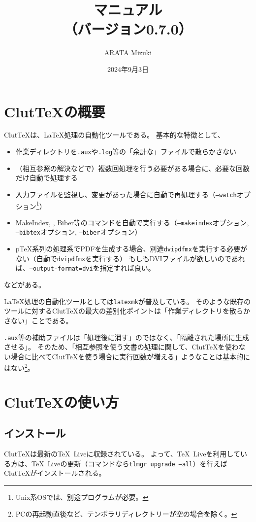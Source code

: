 \documentclass[a4paper]{ltjsreport}
\title{\ClutTeX{}マニュアル\\（バージョン0.7.0）}%
\author{ARATA Mizuki}
\date{2024年9月3日}
\newcommand\ClutTeX{Clut\TeX}
\begin{document}
\maketitle
\tableofcontents

\chapter{\ClutTeX{}の概要}
\ClutTeX{}は、\LaTeX{}処理の自動化ツールである。
基本的な特徴として、
\begin{itemize}
\item 作業ディレクトリを\texttt{.aux}や\texttt{.log}等の「余計な」ファイルで散らかさない
\item （相互参照の解決などで）複数回処理を行う必要がある場合に、必要な回数だけ自動で処理する
\item 入力ファイルを監視し、変更があった場合に自動で再処理する（\texttt{--watch}オプション\footnote{Unix系OSでは、別途プログラムが必要。}）
\item MakeIndex, \BibTeX, Biber等のコマンドを自動で実行する（\texttt{--makeindex}オプション, \texttt{--bibtex}オプション, \texttt{--biber}オプション）
\item p\TeX 系列の処理系でPDFを生成する場合、別途\texttt{dvipdfmx}を実行する必要がない（自動で\texttt{dvipdfmx}を実行する）
  もしもDVIファイルが欲しいのであれば、\texttt{--output-format=dvi}を指定すれば良い。
\end{itemize}
などがある。

\LaTeX{}処理の自動化ツールとしては\texttt{latexmk}が普及している。
そのような既存のツールに対する\ClutTeX{}の最大の差別化ポイントは「作業ディレクトリを散らかさない」ことである。

\texttt{.aux}等の補助ファイルは「処理後に消す」のではなく、「隔離された場所に生成させる」。
そのため、「相互参照を使う文書の処理に関して、\ClutTeX{}を使わない場合に比べて\ClutTeX{}を使う場合に実行回数が増える」ようなことは基本的にはない\footnote{PCの再起動直後など、テンポラリディレクトリーが空の場合を除く。}。

\chapter{\ClutTeX{}の使い方}
\section{インストール}
\ClutTeX{}は最新の\TeX\ Liveに収録されている。
よって、\TeX\ Liveを利用している方は、\TeX\ Liveの更新（コマンドなら\texttt{tlmgr upgrade --all}）を行えば\ClutTeX{}がインストールされる。
\end{document}
